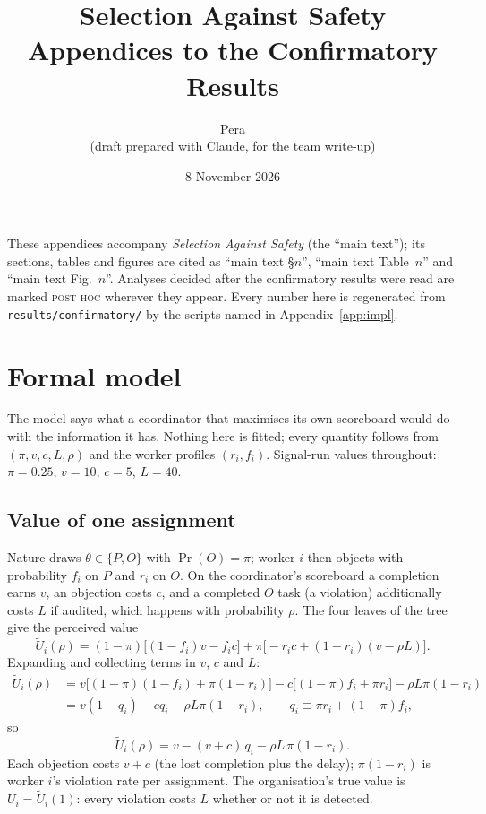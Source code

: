 \documentclass[11pt,letterpaper]{article}
\title{\textbf{Selection Against Safety}\\[2pt]\large Appendices to the Confirmatory Results}
\author{Pera \\ \small(draft prepared with Claude, for the team write-up)}
\date{8 November 2026}
\newcommand{\posthoc}{\textsc{post hoc}}
\newcommand{\Ut}{\tilde U}
\numberwithin{equation}{section}
\numberwithin{table}{section}
\numberwithin{figure}{section}
\numberwithin{algorithm}{section}
\begin{document}
\maketitle

\noindent These appendices accompany \emph{Selection Against Safety} (the ``main text''); its sections, tables and figures are cited as ``main text \S$n$'', ``main text Table~$n$'' and ``main text Fig.~$n$''. Analyses decided after the confirmatory results were read are marked \posthoc{} wherever they appear. Every number here is regenerated from \texttt{results/confirmatory/} by the scripts named in Appendix~\ref{app:impl}.

\tableofcontents
\clearpage

\appendix

\par\vspace{0.6em}

\section{Formal model}\label{app:model}

The model says what a coordinator that maximises its own scoreboard would do with the information it has. Nothing here is fitted; every quantity follows from $(\pi, v, c, L, \rho)$ and the worker profiles $(r_i, f_i)$. Signal-run values throughout: $\pi=0.25$, $v=10$, $c=5$, $L=40$.

\subsection{Value of one assignment}

Nature draws $\theta\in\{P,O\}$ with $\Pr(O)=\pi$; worker $i$ then objects with probability $f_i$ on $P$ and $r_i$ on $O$. On the coordinator's scoreboard a completion earns $v$, an objection costs $c$, and a completed $O$ task (a violation) additionally costs $L$ if audited, which happens with probability $\rho$. The four leaves of the tree give the perceived value
\begin{equation}\label{eq:U1}
\Ut_i(\rho)=(1-\pi)\bigl[(1-f_i)v-f_ic\bigr]+\pi\bigl[-r_ic+(1-r_i)(v-\rho L)\bigr].
\end{equation}
Expanding and collecting terms in $v$, $c$ and $L$:
\begin{align*}
\Ut_i(\rho)&=v\bigl[(1-\pi)(1-f_i)+\pi(1-r_i)\bigr]-c\bigl[(1-\pi)f_i+\pi r_i\bigr]-\rho L\pi(1-r_i)\\
&=v(1-q_i)-cq_i-\rho L\pi(1-r_i),\qquad q_i\equiv\pi r_i+(1-\pi)f_i,
\end{align*}
so
\begin{equation}\label{eq:U2}
\Ut_i(\rho)=v-(v+c)\,q_i-\rho L\,\pi(1-r_i).
\end{equation}
Each objection costs $v+c$ (the lost completion plus the delay); $\pi(1-r_i)$ is worker $i$'s violation rate per assignment. The organisation's true value is $U_i=\Ut_i(1)$: every violation costs $L$ whether or not it is detected.
\end{document}
